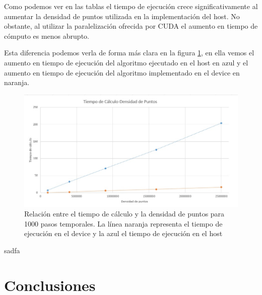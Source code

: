 \documentclass[11pt,a4paper,twoside,pdf]{article}
\numberwithin{equation}{section}
\begin{document}
Como podemos ver en las tablas el tiempo de ejecución crece significativamente al aumentar la densidad de puntos utilizada en la implementación del host. No obstante, al utilizar la paralelización ofrecida por CUDA el aumento en tiempo de cómputo es menos abrupto.

Esta diferencia podemos verla de forma más clara en la figura \ref{fig:t-densidad_de_puntos}, en ella vemos el aumento en tiempo de ejecución del algoritmo ejecutado en el host en azul y el aumento en tiempo de ejecución del algoritmo implementado en el device en naranja.

\begin{figure}[h]
\centering
\includegraphics[width=15 cm]{T-Densidad_de_Puntos.jpg}				
\caption{Relación entre el tiempo de cálculo y la densidad de puntos para 1000 pasos temporales. La línea naranja representa el tiempo de ejecución en el device y la azul el tiempo de ejecución en el host}
\label{fig:t-densidad_de_puntos}
\end{figure}
\noindent

sadfa








\section{Conclusiones}



\newpage

\end{document}
